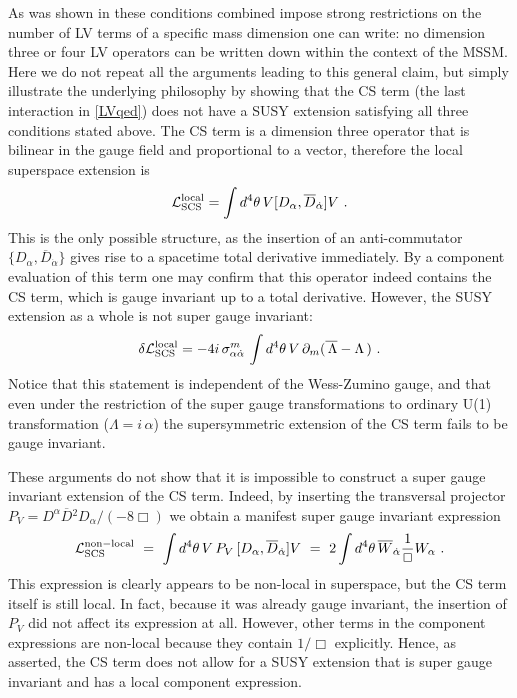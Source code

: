 \documentclass[12pt]{revtex4}
\begin{document}
As was shown in \cite{GrootNibbelink:2004za} these conditions 
combined impose strong restrictions on the number of LV terms of
a specific mass dimension one can write: no dimension three or four
LV operators can be written down within the context of the MSSM. 
Here we do not repeat all the arguments leading to this general claim,
but simply illustrate the underlying philosophy by showing that the CS
term (the last interaction in \eqref{LVqed}) does not have a SUSY
extension satisfying all three conditions stated above. The CS term is
a dimension three operator that is bilinear in the gauge field and
proportional to a vector, therefore the local superspace extension is 
\begin{equation}
{\cal L}_{\rm SCS}^{\rm local} = \int d^4 \theta \, 
V [ D_\alpha, \overline{D}_{\dot\alpha}] V~.
\end{equation} 
This is the only possible structure, as the insertion of an anti-commutator 
$\{D_\alpha, \overline{D}_{\dot\alpha}\}$ gives rise to a spacetime
total derivative immediately. By a component evaluation of this term
one may confirm that this operator indeed contains the CS term, which
is gauge invariant up to a total derivative. However, the
SUSY extension as a whole is not super gauge invariant: 
\begin{equation}
\delta {\cal L}_{\rm SCS}^{\rm local} 
= - 4 i\, \sigma_{\alpha\dot{\alpha}}^m\, 
\int d^4 \theta \, 
V\, \partial_m ( \overline{\, \Lambda} - \Lambda \,)~. 
\end{equation} 
Notice that this statement is independent of the Wess-Zumino
gauge, and that even under the restriction of  the super gauge
transformations to ordinary U(1) transformation 
($\Lambda = i \,\alpha$) the supersymmetric extension of the CS term
fails to be gauge invariant.  


These arguments do not show that it is impossible to construct a super
gauge invariant extension of the CS term. Indeed, by inserting the
transversal projector 
$P_V = D^\alpha \overline{D}{}^2 D_\alpha/(-8 \Box)$
we obtain a manifest super gauge invariant expression 
\begin{equation}
{\cal L}_{\rm SCS}^{\rm non-local} ~=~ \int d^4 \theta \, 
V\, P_V\,  [ D_\alpha, \overline{D}_{\dot\alpha}] V
~=~
2 \int d^4 \theta \, 
\overline{W}_{\dot\alpha} \frac 1{\Box} W_\alpha
~.
\end{equation} 
This expression is clearly appears to be non-local in superspace, but
the CS term itself is still local. In fact, because it was already
gauge invariant, the insertion of $P_V$ did not affect its expression
at all. However, other terms in the component expressions are
non-local because they contain $1/\Box$ explicitly. Hence, as
asserted, the CS term does not allow for a SUSY extension that is super
gauge invariant and has a local component expression. 
\end{document}
